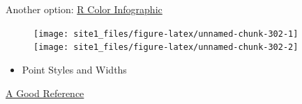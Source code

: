 \documentclass[]{book}
\newenvironment{Shaded}{\begin{snugshade}}{\end{snugshade}}
\newcommand{\KeywordTok}[1]{\textcolor[rgb]{0.13,0.29,0.53}{\textbf{#1}}}
\newcommand{\DataTypeTok}[1]{\textcolor[rgb]{0.13,0.29,0.53}{#1}}
\newcommand{\DecValTok}[1]{\textcolor[rgb]{0.00,0.00,0.81}{#1}}
\newcommand{\StringTok}[1]{\textcolor[rgb]{0.31,0.60,0.02}{#1}}
\newcommand{\CommentTok}[1]{\textcolor[rgb]{0.56,0.35,0.01}{\textit{#1}}}
\newcommand{\OperatorTok}[1]{\textcolor[rgb]{0.81,0.36,0.00}{\textbf{#1}}}
\newcommand{\NormalTok}[1]{#1}
\providecommand{\tightlist}{%
  \setlength{\itemsep}{0pt}\setlength{\parskip}{0pt}}
\begin{document}
Another option:
\href{http://research.stowers-institute.org/efg/R/Color/Chart/ColorsChart1.jpg}{R
Color Infographic}

\begin{Shaded}
\end{Shaded}

\begin{figure}

{\centering \texttt{[image: site1\_files/figure-latex/unnamed-chunk-302-1]} \texttt{[image: site1\_files/figure-latex/unnamed-chunk-302-2]} 

}

\caption{ }\label{fig:unnamed-chunk-302}
\end{figure}

\begin{itemize}
\tightlist
\item
  Point Styles and Widths
\end{itemize}

\href{http://www.endmemo.com/program/R/pic/pchsymbols.png}{A Good
Reference}
\end{document}
